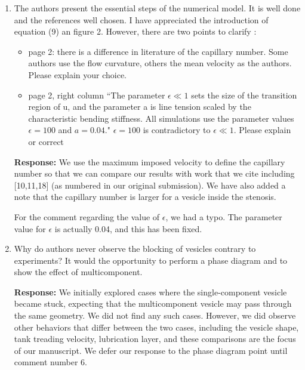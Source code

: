 \documentclass[11pt]{article}
\begin{document}
\begin{enumerate}
\item The authors present the essential steps of the numerical model. It
  is well done and the references well chosen. I have appreciated the
    introduction of equation (9) an figure 2. However, there are two
    points to clarify :
    \begin{itemize}
      \item page 2: there is a difference in literature of the
        capillary number. Some authors use the flow curvature, others
        the mean velocity as the authors. Please explain your choice.
      \item page 2, right column ``The parameter $\epsilon \ll 1$ sets
        the size of the transition region of u, and the parameter a is
        line tension scaled by the characteristic bending stiffness. All
        simulations use the parameter values $\epsilon = 100$ and $a =
        0.04.$" $\epsilon = 100$ is contradictory to $\epsilon \ll 1$.
        Please explain or correct
    \end{itemize}

\noindent
{\bf Response:} We use the maximum imposed velocity to define the
capillary number so that we can compare our results with work that we
cite including [10,11,18] (as numbered in our original submission). We
have also added a note that the capillary number is larger for a vesicle
inside the stenosis.

For the comment regarding the value of $\epsilon$, we had a
typo. The parameter value for $\epsilon$ is actually 0.04, and this has
been fixed.

\item Why do authors never observe the blocking of vesicles contrary to
  experiments? It would the opportunity to perform a phase diagram and
    to show the effect of multicomponent.

\noindent
{\bf Response:} We initially explored cases where the single-component
vesicle became stuck, expecting that the multicomponent vesicle may pass
through the same geometry. We did not find any such cases.
However, we did observe other behaviors that differ between the two
cases, including the vesicle shape, tank treading velocity, lubrication
layer, and these comparisons are the focus of our manuscript. We defer
our response to the phase diagram point until comment number 6.

%



\end{enumerate}
\end{document}
